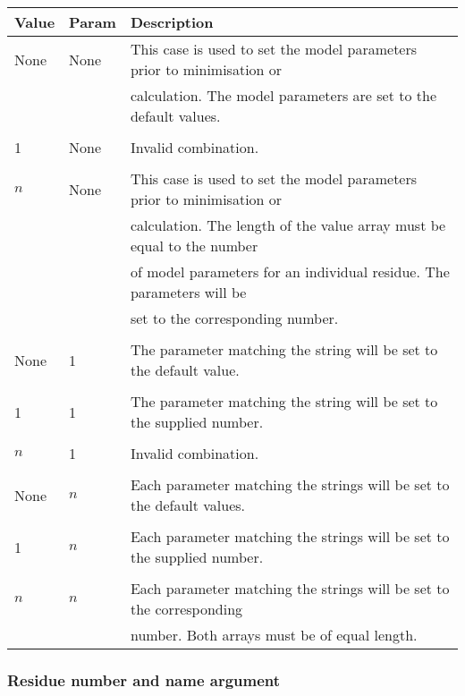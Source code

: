  \begin{center} 
 \begin{tabular}{lll} 
 \toprule 
  Value & Param & Description  \\ 
 \midrule 
  None & None & This case is used to set the model parameters prior to minimisation\index{minimisation} or  \\
   &  & calculation.  The model parameters are set to the default values.  \\
   &  &   \\
  1 & None & Invalid combination.  \\
   &  &   \\
  $n$ & None & This case is used to set the model parameters prior to minimisation\index{minimisation} or  \\
   &  & calculation.  The length of the value array must be equal to the number  \\
   &  & of model parameters for an individual residue.  The parameters will be  \\
   &  & set to the corresponding number.  \\
   &  &   \\
  None & 1 & The parameter matching the string will be set to the default value.  \\
   &  &   \\
  1 & 1 & The parameter matching the string will be set to the supplied number.  \\
   &  &   \\
  $n$ & 1 & Invalid combination.  \\
   &  &   \\
  None & $n$ & Each parameter matching the strings will be set to the default values.  \\
   &  &   \\
  1 & $n$ & Each parameter matching the strings will be set to the supplied number.  \\
   &  &   \\
  $n$ & $n$ & Each parameter matching the strings will be set to the corresponding  \\
   &  & number.  Both arrays must be of equal length.  \\
 \bottomrule 
 \end{tabular} 
 \end{center} 
  

  
 \subsubsection{Residue number and name argument} 

